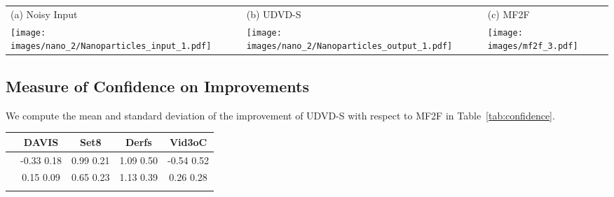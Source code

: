 \documentclass[final]{cvpr}
\begin{document}
\begin{figure*}[ht]
    \def\f1ht{0.20\textwidth}\centering 
    \begin{tabular}{ >{\centering\arraybackslash}m{}
     >{\centering\arraybackslash}m{} 
     >{\centering\arraybackslash}m{}}
     \centering
     
     \hspace{2mm}  \footnotesize{(a) Noisy Input} &   \footnotesize{(b) UDVD-S} &  \footnotesize{(c) MF2F}  \\

     \texttt{[image: images/nano\_2/Nanoparticles\_input\_1.pdf]} &
     \texttt{[image: images/nano\_2/Nanoparticles\_output\_1.pdf]} &
     \texttt{[image: images/mf2f\_3.pdf]} \\
    
    \end{tabular}
     
\caption{\textbf{UDVD-S outperforms MF2F on electron microscopy data}. UDVD-S is able to effectively denoise real-world data acquired from an electron-microscopy, but MF2F \emph{fails}.  
}

\label{fig:comparison_nano_mf2f}
\end{figure*}



\subsection{Measure of Confidence on Improvements}

We compute the mean and standard deviation of the improvement of UDVD-S with respect to MF2F in Table~\ref{tab:confidence}.


\begin{table*}[ht]
    \centering
    \begin{tabular}{ccccc}
        \toprule
        
        \multicolumn{1}{l}{\phantom} &
        \multicolumn{1}{c}{DAVIS} &
        \multicolumn{1}{c}{Set8} &
        \multicolumn{1}{c}{Derfs} & 
        \multicolumn{1}{c}{Vid3oC} \\

        \midrule
        
         & -0.33  0.18 & 0.99  0.21 & 1.09  0.50 & -0.54  0.52 \\
         & 0.15  0.09 & 0.65  0.23 & 1.13  0.39 & 0.26  0.28 \\
        
        \bottomrule \\
    \end{tabular}
    \caption{\textbf{Measure of confidence on improvement of UDVD-S with respect to MF2F}. We compute the mean and standard deviation of the difference between performance on UDVD-S and MF2F (in PSNR) on four different datasets and two different noise levels (). UDVD-S outperforms MF2F with high certainty on two datasets at low noise level () and all the four datasets at high noise level ().
        }
    \label{tab:confidence}
\end{table*}
\end{document}
